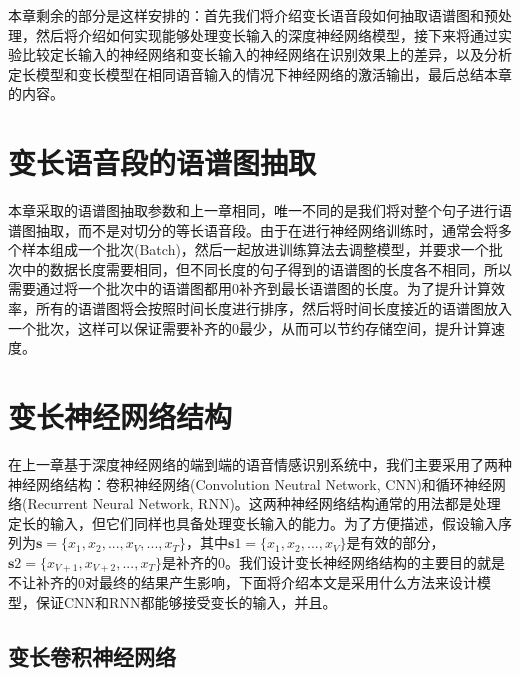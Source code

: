 本章剩余的部分是这样安排的：首先我们将介绍变长语音段如何抽取语谱图和预处理，然后将介绍如何实现能够处理变长输入的深度神经网络模型，接下来将通过实验比较定长输入的神经网络和变长输入的神经网络在识别效果上的差异，以及分析定长模型和变长模型在相同语音输入的情况下神经网络的激活输出，最后总结本章的内容。

\section{变长语音段的语谱图抽取}

本章采取的语谱图抽取参数和上一章相同，唯一不同的是我们将对整个句子进行语谱图抽取，而不是对切分的等长语音段。由于在进行神经网络训练时，通常会将多个样本组成一个批次(Batch)，然后一起放进训练算法去调整模型，并要求一个批次中的数据长度需要相同，但不同长度的句子得到的语谱图的长度各不相同，所以需要通过将一个批次中的语谱图都用0补齐到最长语谱图的长度。为了提升计算效率，所有的语谱图将会按照时间长度进行排序，然后将时间长度接近的语谱图放入一个批次，这样可以保证需要补齐的0最少，从而可以节约存储空间，提升计算速度。

\section{变长神经网络结构}
\label{sec:var_len_nn}

在上一章基于深度神经网络的端到端的语音情感识别系统中，我们主要采用了两种神经网络结构：卷积神经网络(Convolution Neutral Network, CNN)和循环神经网络(Recurrent Neural Network, RNN)。这两种神经网络结构通常的用法都是处理定长的输入，但它们同样也具备处理变长输入的能力。为了方便描述，假设输入序列为$\mathbf{s} = \{x_1, x_2,...,x_V,...,x_T\}$，其中$\mathbf{s}1 = \{x_1, x_2,...,x_V\}$是有效的部分，$\mathbf{s}2 = \{x_{V+1}, x_{V+2},...,x_T\}$是补齐的0。我们设计变长神经网络结构的主要目的就是不让补齐的0对最终的结果产生影响，下面将介绍本文是采用什么方法来设计模型，保证CNN和RNN都能够接受变长的输入，并且。

\subsection{变长卷积神经网络}
\label{ssec:var_len_cnn}

